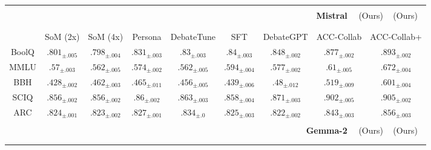 \begin{table}[tbh]
\begin{adjustbox}{max width=1.0\textwidth}
\begin{tabular}{c|c|c|c|c|c|c||c|c}
\multicolumn{9}{c}{}\\
\multicolumn{9}{r}{\textbf{Mistral} ~~\qquad\qquad\qquad\qquad\qquad\qquad  (Ours)      \quad\qquad~   (Ours)\qquad~}\\
\hline\vspace{2pt}\\
& & & & & & & & \vspace{-20pt}\\

& SoM (2x) & SoM (4x) & Persona & DebateTune & SFT & DebateGPT & \cellcolor{green!20} ACC-Collab & \cellcolor{green!20} ACC-Collab+\\
BoolQ & $.801_{\pm.005}$ & $.798_{\pm.004}$ & $.831_{\pm.003}$ & $.83_{\pm.003}$ & $.84_{\pm.003}$ & $.848_{\pm.002}$ & $.877_{\pm.002}$ & $\mathbf{.893}_{\pm.002}$\\ 
MMLU & $.57_{\pm.003}$ & $.562_{\pm.005}$ & $.574_{\pm.002}$ & $.562_{\pm.005}$ & $.594_{\pm.004}$ & $.577_{\pm.002}$ & $.61_{\pm.005}$ & $\mathbf{.672}_{\pm.004}$\\ 
BBH & $.428_{\pm.002}$ & $.462_{\pm.003}$ & $.465_{\pm.011}$ & $.456_{\pm.005}$ & $.439_{\pm.006}$ & $.48_{\pm.012}$ & $.519_{\pm.009}$ & $\mathbf{.601}_{\pm.004}$\\ 
SCIQ & $.856_{\pm.002}$ & $.856_{\pm.002}$ & $.86_{\pm.002}$ & $.863_{\pm.003}$ & $.858_{\pm.004}$ & $.871_{\pm.003}$ & $.902_{\pm.005}$ & $\mathbf{.905}_{\pm.002}$\\ 
ARC & $.824_{\pm.001}$ & $.823_{\pm.002}$ & $.827_{\pm.001}$ & $.834_{\pm.0}$ & $.825_{\pm.003}$ & $.822_{\pm.002}$ & $.843_{\pm.003}$ & $\mathbf{.856}_{\pm.003}$\\ 


\multicolumn{9}{c}{}\\
\multicolumn{9}{r}{\textbf{Gemma-2} ~~\quad\qquad\qquad\qquad\qquad\qquad  (Ours)      \quad\qquad~   (Ours)\qquad~}\\
\hline\vspace{2pt}\\
\multicolumn{9}{c}{}\vspace{-20pt}\\


\end{tabular}
\end{adjustbox}
\end{table}
